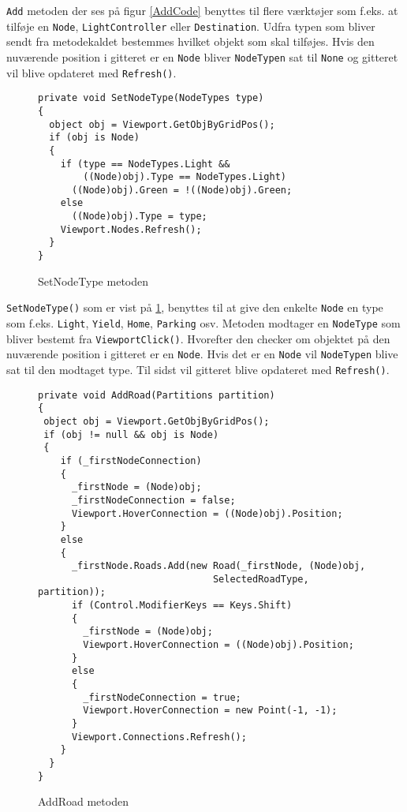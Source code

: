 \texttt{Add} metoden der ses på figur \ref{AddCode} benyttes til flere værktøjer som f.eks. at tilføje en \texttt{Node}, \texttt{LightController} eller \texttt{Destination}. Udfra typen som bliver sendt fra metodekaldet bestemmes hvilket objekt som skal tilføjes. Hvis den nuværende position i gitteret er en \texttt{Node} bliver \texttt{NodeTypen} sat til \texttt{None} og gitteret vil blive opdateret med \texttt{Refresh()}.

\begin{figure}[H]
\begin{lstlisting}
private void SetNodeType(NodeTypes type)
{
  object obj = Viewport.GetObjByGridPos();
  if (obj is Node)
  {
    if (type == NodeTypes.Light && 
        ((Node)obj).Type == NodeTypes.Light)
      ((Node)obj).Green = !((Node)obj).Green;
    else
      ((Node)obj).Type = type;
    Viewport.Nodes.Refresh();
  }
}
\end{lstlisting}
\caption{SetNodeType metoden}\label{SetNodeTypeCode}
\end{figure}

\texttt{SetNodeType()} som er vist på \ref{SetNodeTypeCode}, benyttes til at give den enkelte \texttt{Node} en type som f.eks. \texttt{Light}, \texttt{Yield}, \texttt{Home}, \texttt{Parking} osv. Metoden modtager en \texttt{NodeType} som bliver bestemt fra \texttt{ViewportClick()}. Hvorefter den checker om objektet på den nuværende position i gitteret er en \texttt{Node}. Hvis det er en \texttt{Node} vil \texttt{NodeTypen} blive sat til den modtaget type. Til sidst vil gitteret blive opdateret med \texttt{Refresh()}.

\begin{figure}[H]
\begin{lstlisting}
private void AddRoad(Partitions partition)
{
 object obj = Viewport.GetObjByGridPos();
 if (obj != null && obj is Node)
 {
    if (_firstNodeConnection)
    {
      _firstNode = (Node)obj;
      _firstNodeConnection = false;
      Viewport.HoverConnection = ((Node)obj).Position;
    }
    else
    {
      _firstNode.Roads.Add(new Road(_firstNode, (Node)obj, 
                               SelectedRoadType, partition));
      if (Control.ModifierKeys == Keys.Shift)
      {
        _firstNode = (Node)obj;
        Viewport.HoverConnection = ((Node)obj).Position;
      }
      else
      {
        _firstNodeConnection = true;
        Viewport.HoverConnection = new Point(-1, -1);
      }
      Viewport.Connections.Refresh();
    }
  }
}
\end{lstlisting}
\caption{AddRoad metoden}\label{AddRoadCode}
\end{figure}

